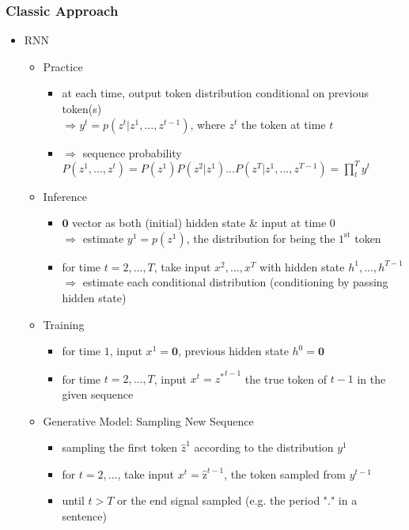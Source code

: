 \subsubsection{Classic Approach}
\begin{itemize}
\item RNN
	\begin{itemize}
	\item Practice
		\begin{itemize}
		\item at each time, output token distribution conditional on previous token(s) \\
		$\Rightarrow y^t = p(z^t|z^1,...,z^{t-1})$, where $z^t$ the token at time $t$
		\item $\Rightarrow$ sequence probability $\displaystyle P(z^1,...,z^{t}) = P(z^1)P(z^2|z^1)...P(z^T|z^1,...,z^{T-1})= \prod^T_{t}y^t$
		\end{itemize}
	\item Inference
		\begin{itemize}
		\item $\mathbf 0$ vector as both (initial) hidden state \& input at time $0$ \\
		$\Rightarrow$ estimate $y^1=p(z^1)$, the distribution for being the $1^\text{st}$ token
		\item for time $t=2,...,T$, take input $x^2,...,x^T$ with hidden state $h^1,...,h^{T-1}$ \\ 
		$\Rightarrow$ estimate each conditional distribution (conditioning by passing hidden state)
		\end{itemize}
	\item Training
		\begin{itemize}
		\item for time $1$, input $x^1=\mathbf 0$, previous hidden state $h^0=\mathbf 0$
		\item for time $t=2,...,T$, input $x^t = {z^*}^{t-1}$ the true token of $t-1$ in the given sequence
		\end{itemize}
	\item Generative Model: Sampling New Sequence
		\begin{itemize}
		\item sampling the first token $\hat{z}^1$ according to the distribution $y^1$
		\item for $t=2,...$, take input $x^t=\hat{\text{z}}^{t-1}$, the token sampled from $y^{t-1}$
		\item until $t>T$ or the end signal sampled (e.g. the period "." in a sentence)
		\end{itemize}
	\end{itemize}
\end{itemize}

